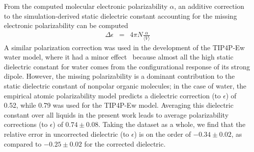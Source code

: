 \documentclass[journal=jacsat,manuscript=article]{achemso}
\begin{document}

From the computed molecular electronic polarizability $\alpha$, an additive correction to the simulation-derived static dielectric constant accounting for the missing electronic polarizability can be computed~\cite{horn2004}
\begin{eqnarray}
\Delta \epsilon &=& 4 \pi N  \frac{\alpha}{\langle V \rangle} \label{equation:dielectric correction}
\end{eqnarray}
A similar polarization correction was used in the development of the TIP4P-Ew water model, where it had a minor effect~\cite{horn2004} because almost all the high static dielectric constant for water comes from the configurational response of its strong dipole.  
However, the missing polarizability is a dominant contribution to the static dielectric constant of nonpolar organic molecules;   
in the case of water, the empirical atomic polarizability model predicts a dielectric correction (to $\epsilon$) of 0.52, while 0.79 was used for the TIP4P-Ew model.  
Averaging this dielectric constant over all liquids in the present work leads to average polarizability corrections (to $\epsilon$) of $0.74 \pm 0.08$. 
Taking the dataset as a whole, we find that the relative error in uncorrected dielectric (to $\epsilon$) is on the order of $-0.34 \pm 0.02$, as compared to $-0.25 \pm 0.02$ for the corrected dielectric. 

\end{document}
